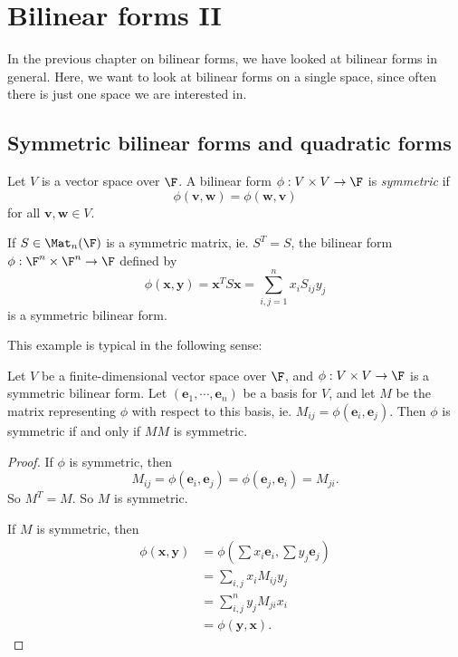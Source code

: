 \documentclass[a4paper]{article}
\begin{document}
\section{Bilinear forms II}
In the previous chapter on bilinear forms, we have looked at bilinear forms in general. Here, we want to look at bilinear forms on a single space, since often there is just one space we are interested in.
\subsection{Symmetric bilinear forms and quadratic forms}

\begin{defi}
  Let $V$ is a vector space over $\F$. A bilinear form $\phi: V \times V \to \F$ is \emph{symmetric} if
  \[
    \phi(\mathbf{v}, \mathbf{w}) = \phi(\mathbf{w}, \mathbf{v})
  \]
  for all $\mathbf{v}, \mathbf{w} \in V$.
\end{defi}

\begin{eg}
  If $S \in \Mat_n(\F)$ is a symmetric matrix, ie. $S^T = S$, the bilinear form $\phi: \F^n \times \F^n \to \F$ defined by
  \[
    \phi(\mathbf{x}, \mathbf{y}) = \mathbf{x}^T S\mathbf{x} = \sum_{i, j = 1}^n x_i S_{ij} y_j
  \]
  is a symmetric bilinear form.
\end{eg}
This example is typical in the following sense:

\begin{lemma}
  Let $V$ be a finite-dimensional vector space over $\F$, and $\phi: V\times V \to \F$ is a symmetric bilinear form. Let $(\mathbf{e}_1, \cdots, \mathbf{e}_n)$ be a basis for $V$, and let $M$ be the matrix representing $\phi$ with respect to this basis, ie. $M_{ij} = \phi(\mathbf{e}_i, \mathbf{e}_j)$. Then $\phi$ is symmetric if and only if $MM$ is symmetric.
\end{lemma}

\begin{proof}
  If $\phi$ is symmetric, then
  \[
    M_{ij} = \phi(\mathbf{e}_i, \mathbf{e}_j) = \phi(\mathbf{e}_j, \mathbf{e}_i) = M_{ji}.
  \]
  So $M^T = M$. So $M$ is symmetric.

  If $M$ is symmetric, then
  \begin{align*}
    \phi(\mathbf{x}, \mathbf{y}) &= \phi\left(\sum x_i \mathbf{e}_i, \sum y_j \mathbf{e}_j\right)\\
    &= \sum_{i, j} x_i M_{ij} y_j\\
    &= \sum_{i, j}^n y_j M_{ji} x_i\\
    &= \phi(\mathbf{y}, \mathbf{x}).
  \end{align*}
\end{proof}
\end{document}
